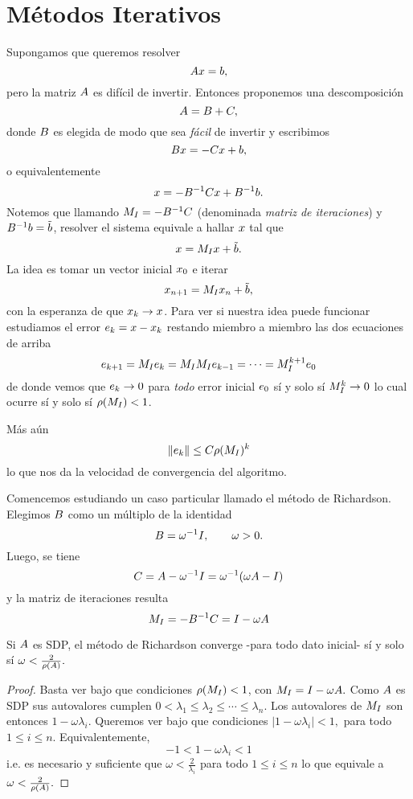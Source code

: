 \section{Métodos Iterativos}
Supongamos que queremos resolver
$$
\Ab\xb=\bb,
$$
pero la matriz $\Ab$ es difícil de invertir. Entonces proponemos una descomposición
$$\Ab=\Bb+\Cb,$$
donde $\Bb$ es elegida de modo que sea \emph{fácil} de invertir y escribimos
$$
\Bb\xb=-\Cb\xb+\bb,
$$
o equivalentemente
$$
\xb=-\Bb^{-1}\Cb\xb+\Bb^{-1}\bb.
$$
Notemos que llamando $\Mb_I=-\Bb^{-1}\Cb$  (denominada \emph{matriz de iteraciones}) y $\Bb^{-1}\bb=\tilde{\bb}$,  resolver el sistema equivale a hallar $\xb$ tal que
$$
\xb=\Mb_I\xb+\tilde{\bb}.
$$
La idea es tomar un vector inicial $\xb_0$ e iterar
$$
\xb_{n+1}=\Mb_I\xb_n+\tilde{\bb},
$$
con la esperanza de que $\xb_k\to \xb$. Para ver si nuestra idea puede funcionar estudiamos el error $\eb_k=\xb-\xb_k$ restando miembro a miembro las dos ecuaciones de arriba
$$
\eb_{k+1}=\Mb_I\eb_k=\Mb_I\Mb_I\eb_{k-1}=\cdots = \Mb^{k+1}_I\eb_0
$$
de donde vemos que $\eb_k\to \cero$ para \emph{todo} error inicial $\eb_0$ sí y solo sí
$\Mb_I^{k}\to \cero $ lo cual ocurre sí y solo sí $\rho(\Mb_I)<1$.

Más aún
$$
\|\eb_k\|\le C\rho(\Mb_I)^k
$$
lo que nos da la velocidad de convergencia del algoritmo.

Comencemos estudiando un caso particular llamado el método de Richardson.
 Elegimos $\Bb$ como un múltiplo de la identidad
$$\Bb=\omega^{-1}\Ib, \qquad \omega>0.$$
Luego, se tiene
$$\Cb=\Ab-\omega^{-1}\Ib=\omega^{-1}(\omega\Ab-\Ib)$$
y la matriz de iteraciones resulta
$$
\Mb_I=-\Bb^{-1}\Cb=
\Ib-\omega\Ab
$$

\tcc
\begin{proposicion}
Si $\Ab$ es SDP, el método de Richardson converge -para todo dato inicial- sí y solo sí $\omega<\frac{2}{\rho(\Ab)}.$
\end{proposicion}
\etcc

\begin{proof}
 Basta ver bajo que condiciones $\rho(\Mb_I)<1$, con $
\Mb_I=
\Ib-\omega\Ab.
$ Como $\Ab$ es SDP sus autovalores cumplen $0<\lambda_1\le \lambda_2\le \cdots \le \lambda_n$. Los autovalores de $
\Mb_I$ son entonces $1-\omega\lambda_i$.  Queremos ver bajo que condiciones
$
|1-\omega\lambda_i|<1,
$ para todo $1\le i\le n$. Equivalentemente,
$$
-1< 1-\omega\lambda_i< 1
$$
i.e. es necesario y suficiente que $\omega<\frac{2}{\lambda_i}$ para todo $1\le i\le n$ lo que equivale a
$\omega<\frac{2}{\rho(\Ab)}.$
\end{proof}

